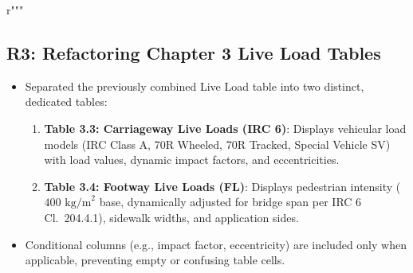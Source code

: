 r"""\documentclass[11pt,a4paper]{article}
\begin{document}
\subsection{R3: Refactoring Chapter 3 Live Load Tables}
\begin{itemize}
    \item Separated the previously combined Live Load table into two distinct, dedicated tables:
    \begin{enumerate}
        \item \textbf{Table 3.3: Carriageway Live Loads (IRC 6)}: Displays vehicular load models (IRC Class A, 70R Wheeled, 70R Tracked, Special Vehicle SV) with load values, dynamic impact factors, and eccentricities.
        \item \textbf{Table 3.4: Footway Live Loads (FL)}: Displays pedestrian intensity ($400\text{ kg/m}^2$ base, dynamically adjusted for bridge span per IRC 6 Cl.~204.4.1), sidewalk widths, and application sides.
    \end{enumerate}
    \item Conditional columns (e.g., impact factor, eccentricity) are included only when applicable, preventing empty or confusing table cells.
\end{itemize}
\end{document}
